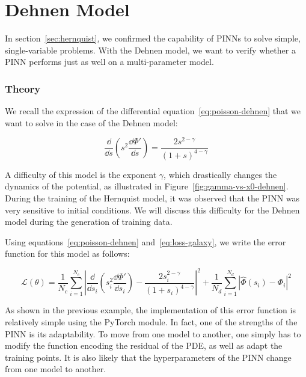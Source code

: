 \section{Dehnen Model}\label{sec:dehnen}

In section~\ref{sec:hernquist}, we confirmed the capability of PINNs to solve simple, single-variable problems. With the Dehnen model, we want to verify whether a PINN performs just as well on a multi-parameter model.

\subsubsection{Theory}

We recall the expression of the differential equation~\eqref{eq:poisson-dehnen} that we want to solve in the case of the Dehnen model:

\begin{equation*}
    \dfrac{\dd}{\dd s}\left(s^2 \dfrac{\dd \Phi'}{\dd s}\right) = \dfrac{2s^{2-\gamma}}{(1+s)^{4-\gamma}}
\end{equation*}

A difficulty of this model is the exponent $\gamma$, which drastically changes the dynamics of the potential, as illustrated in Figure~\ref{fig:gamma-vs-x0-dehnen}. During the training of the Hernquist model, it was observed that the PINN was very sensitive to initial conditions. We will discuss this difficulty for the Dehnen model during the generation of training data.

Using equations~\eqref{eq:poisson-dehnen} and~\eqref{eq:loss-galaxy}, we write the error function for this model as follows:

\begin{equation}
    \label{eq:loss-dehnen-explicit}
    \mathcal{L}(\theta) = \dfrac{1}{N_c}\sum^{N_c}_{i=1} \left|\dfrac{\dd}{\dd s_i}\left(s_{i}^{2} \dfrac{\dd \Phi'}{\dd s_i}\right) - \dfrac{2s_i^{2-\gamma}}{(1+s_i)^{4-\gamma}} \right|^2 + \dfrac{1}{N_d}\sum^{N_d}_{i=1} \left|\hat{\Phi}(s_i) - \Phi_i\right|^2
\end{equation}

As shown in the previous example, the implementation of this error function is relatively simple using the PyTorch module. In fact, one of the strengths of the PINN is its adaptability. To move from one model to another, one simply has to modify the function encoding the residual of the PDE, as well as adapt the training points. It is also likely that the hyperparameters of the PINN change from one model to another.

